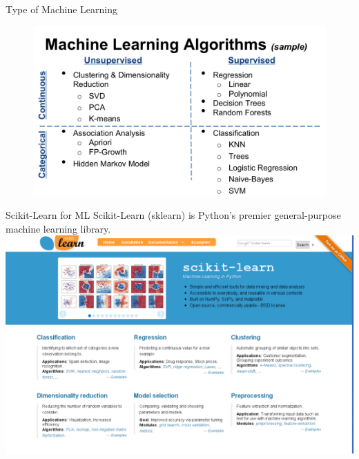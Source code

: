 \documentclass{bredelebeamer}
\begin{document}
\begin{frame}{Type of Machine Learning}
\begin{figure}[h]
\includegraphics[scale=0.55]{../image/ml_type3.png}
\end{figure}
\end{frame}

\begin{frame}{Scikit-Learn for ML}
Scikit-Learn (sklearn) is Python's premier general-purpose machine learning library.
\centering
\includegraphics[scale=0.30]{../image/sklearn.png} 
\end{frame}
\end{document}
